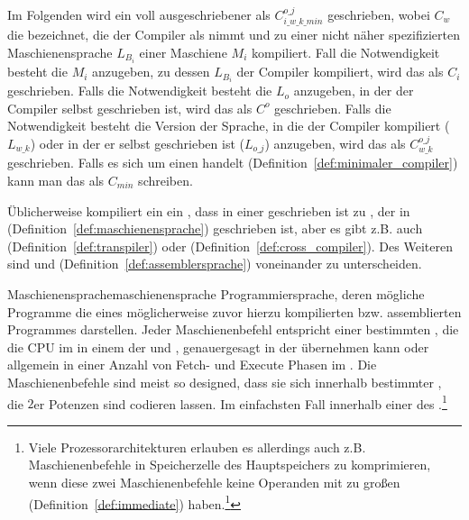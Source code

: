 \begin{Special_Paragraph}
  Im Folgenden wird ein voll ausgeschriebener  als $C_{i\_w\_k\_{min}}^{o\_j}$ geschrieben, wobei $C_w$ die  bezeichnet, die der Compiler als  nimmt und zu einer nicht näher spezifizierten Maschienensprache $L_{B_i}$ einer Maschiene $M_i$ kompiliert. Fall die Notwendigkeit besteht die  $M_i$ anzugeben, zu dessen  $L_{B_i}$ der Compiler kompiliert, wird das als $C_{i}$ geschrieben. Falls die Notwendigkeit besteht die  $L_o$ anzugeben, in der der Compiler selbst geschrieben ist, wird das als $C^o$ geschrieben. Falls die Notwendigkeit besteht die Version der Sprache, in die der Compiler kompiliert ($L_{w\_k}$) oder in der er selbst geschrieben ist ($L_{o\_j}$) anzugeben, wird das als $C_{w\_k}^{o\_j}$ geschrieben. Falls es sich um einen  handelt (Definition~\ref{def:minimaler_compiler}) kann man das als $C_{min}$ schreiben.
\end{Special_Paragraph}

Üblicherweise kompiliert ein  ein , dass in einer  geschrieben ist zu , der in  (Definition~\ref{def:maschienensprache}) geschrieben ist, aber es gibt z.B. auch  (Definition~\ref{def:transpiler}) oder  (Definition~\ref{def:cross_compiler}). Des Weiteren sind  und  (Definition~\ref{def:assemblersprache}) voneinander zu unterscheiden.

\begin{Definition}{Maschienensprache}{maschienensprache}
  Programmiersprache, deren mögliche Programme die  eines möglicherweise zuvor hierzu kompilierten bzw. assemblierten Programmes darstellen. Jeder Maschienenbefehl entspricht einer bestimmten , die die CPU im  in einem  der  und , genauergesagt in der  übernehmen kann oder allgemein in einer  Anzahl von Fetch- und Execute Phasen im . Die Maschienenbefehle sind meist so designed, dass sie sich innerhalb bestimmter , die $2$er Potenzen sind codieren lassen. Im einfachsten Fall innerhalb einer  des .\footnote{Viele Prozessorarchitekturen erlauben es allerdings auch z.B.  Maschienenbefehle in  Speicherzelle des Hauptspeichers zu komprimieren, wenn diese zwei Maschienenbefehle keine Operanden mit zu großen  (Definition~\ref{def:immediate}) haben.\footcite{scholl_einfuhrung_2021}}
\end{Definition}

